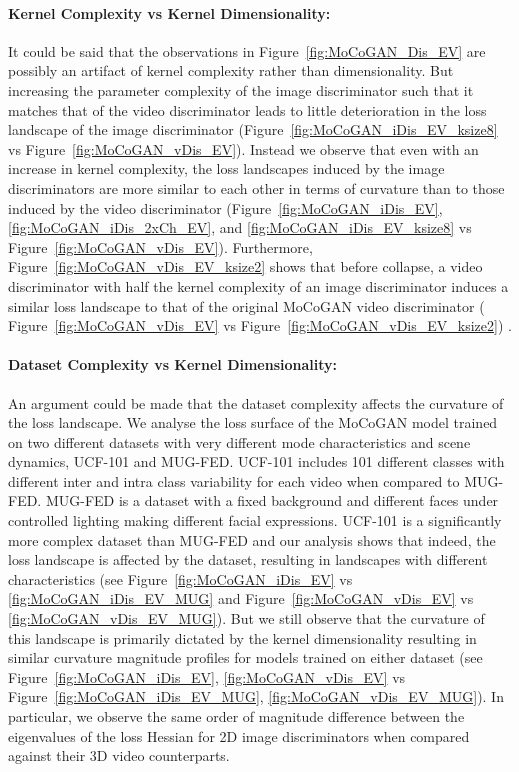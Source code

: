 \documentclass[a4paper,fleqn]{cas-sc}
\begin{document}
\paragraph{Kernel Complexity vs Kernel Dimensionality:}
It could be said that the observations in Figure~\ref{fig:MoCoGAN_Dis_EV} are possibly an artifact of kernel complexity rather than dimensionality. But increasing the parameter complexity of the image discriminator such that it matches that of the video discriminator leads to little deterioration in the loss landscape of the image discriminator (Figure~\ref{fig:MoCoGAN_iDis_EV_ksize8} vs Figure~\ref{fig:MoCoGAN_vDis_EV}). Instead we observe that even with an increase in kernel complexity, the loss landscapes induced by the image discriminators are more similar to each other in terms of curvature than to those induced by the video discriminator (Figure~\ref{fig:MoCoGAN_iDis_EV}, \ref{fig:MoCoGAN_iDis_2xCh_EV}, and \ref{fig:MoCoGAN_iDis_EV_ksize8} vs Figure~\ref{fig:MoCoGAN_vDis_EV}). Furthermore, Figure~\ref{fig:MoCoGAN_vDis_EV_ksize2} shows that before collapse, a video discriminator with half the kernel complexity of an image discriminator induces a similar loss landscape to that of the original MoCoGAN video discriminator ( Figure~\ref{fig:MoCoGAN_vDis_EV} vs  Figure~\ref{fig:MoCoGAN_vDis_EV_ksize2}) . 

\newpage

\paragraph{Dataset Complexity vs Kernel Dimensionality:} An argument could be made that the dataset complexity affects the curvature of the loss landscape. We analyse the loss surface of the MoCoGAN model trained on two different datasets with very different mode characteristics and scene dynamics, UCF-101 and MUG-FED. UCF-101 includes 101 different classes with different inter and intra class variability for each video when compared to MUG-FED. MUG-FED is a dataset with a fixed background and different faces under controlled lighting making different facial expressions. UCF-101 is a significantly more complex dataset than MUG-FED and our analysis shows that indeed, the loss landscape is affected by the dataset, resulting in landscapes with different characteristics (see Figure~\ref{fig:MoCoGAN_iDis_EV} vs \ref{fig:MoCoGAN_iDis_EV_MUG} and Figure~\ref{fig:MoCoGAN_vDis_EV} vs \ref{fig:MoCoGAN_vDis_EV_MUG}). But we still observe that the curvature of this landscape is primarily dictated by the kernel dimensionality resulting in similar curvature magnitude profiles for models trained on either dataset (see Figure~\ref{fig:MoCoGAN_iDis_EV}, \ref{fig:MoCoGAN_vDis_EV} vs Figure~\ref{fig:MoCoGAN_iDis_EV_MUG}, \ref{fig:MoCoGAN_vDis_EV_MUG}). In particular, we observe the same order of magnitude difference between the eigenvalues of the loss Hessian for 2D image discriminators when compared against their 3D video counterparts.
\end{document}
